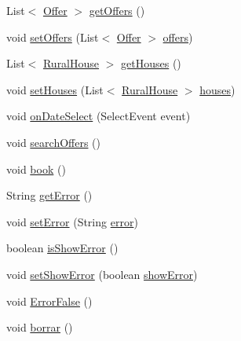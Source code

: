 \begin{DoxyCompactItemize}
\item 
List$<$ \mbox{\hyperlink{classdomain_1_1Offer}{Offer}} $>$ \mbox{\hyperlink{classbean_1_1Query__Bean_a959034af24769ce6348b49a1c0c57d6f}{get\+Offers}} ()
\item 
void \mbox{\hyperlink{classbean_1_1Query__Bean_afec0f4b7677afcdfcae433fdb7e5583f}{set\+Offers}} (List$<$ \mbox{\hyperlink{classdomain_1_1Offer}{Offer}} $>$ \mbox{\hyperlink{classbean_1_1Query__Bean_ab994c486fce1a6f2f3fa9a7b333187ba}{offers}})
\item 
List$<$ \mbox{\hyperlink{classdomain_1_1RuralHouse}{Rural\+House}} $>$ \mbox{\hyperlink{classbean_1_1Query__Bean_aefdbf74a5f2ddbf5b047f5ad56245de5}{get\+Houses}} ()
\item 
void \mbox{\hyperlink{classbean_1_1Query__Bean_a28c9ac3b9469671cb003f85a12b52dc7}{set\+Houses}} (List$<$ \mbox{\hyperlink{classdomain_1_1RuralHouse}{Rural\+House}} $>$ \mbox{\hyperlink{classbean_1_1Query__Bean_a8c158c927390375bed7935b2db5e4f53}{houses}})
\item 
void \mbox{\hyperlink{classbean_1_1Query__Bean_a05981f0ecf96a1afdd0227720934411c}{on\+Date\+Select}} (Select\+Event event)
\item 
void \mbox{\hyperlink{classbean_1_1Query__Bean_a8724eb0d86b07b16a6af560390d77523}{search\+Offers}} ()
\item 
void \mbox{\hyperlink{classbean_1_1Query__Bean_ab57fcbc9df417bf04f3ba9f4b205bd26}{book}} ()
\item 
String \mbox{\hyperlink{classbean_1_1Query__Bean_a008055cfab609b48b5c3e74ddc26303c}{get\+Error}} ()
\item 
void \mbox{\hyperlink{classbean_1_1Query__Bean_a1cae7fad5445fcc2af20ffd9e0803ff7}{set\+Error}} (String \mbox{\hyperlink{classbean_1_1Query__Bean_a41a8d631f015a0b8df5a9b40f5cc3231}{error}})
\item 
boolean \mbox{\hyperlink{classbean_1_1Query__Bean_a906820e31a37424ec307634523ccfbdd}{is\+Show\+Error}} ()
\item 
void \mbox{\hyperlink{classbean_1_1Query__Bean_aac41676c3262ddf384539b5e11e473b7}{set\+Show\+Error}} (boolean \mbox{\hyperlink{classbean_1_1Query__Bean_a7334f280df18d4e790c5a086b8334a0f}{show\+Error}})
\item 
void \mbox{\hyperlink{classbean_1_1Query__Bean_ab2823ce229ec8c9e951e0d5e6861ccaf}{Error\+False}} ()
\item 
void \mbox{\hyperlink{classbean_1_1Query__Bean_af8dc33052ec073a2656c2209f9befb18}{borrar}} ()
\end{DoxyCompactItemize}
